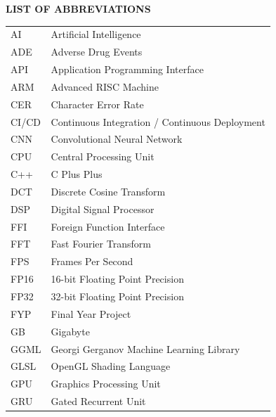 \documentclass[12pt,a4paper]{report}
\begin{document}
\begingroup
\renewcommand{\listtablename}{} %
\renewcommand{\clearpage}{}     %
\listoftables
\endgroup
\thispagestyle{logoheader}


\clearpage
\pagestyle{logoheader}
\thispagestyle{logoheader}
 
\begin{center}
    \vspace{1cm}
    {\large \textbf{LIST OF ABBREVIATIONS}}\\
    \vspace{1cm}
\end{center}

\begin{longtable}{p{6cm} p{9.5cm}}
AI      & Artificial Intelligence \\
ADE     & Adverse Drug Events \\
API     & Application Programming Interface \\
ARM     & Advanced RISC Machine \\
CER     & Character Error Rate \\
CI/CD   & Continuous Integration / Continuous Deployment \\
CNN     & Convolutional Neural Network \\
CPU     & Central Processing Unit \\
C++     & C Plus Plus \\
DCT     & Discrete Cosine Transform \\
DSP     & Digital Signal Processor \\
FFI     & Foreign Function Interface \\
FFT     & Fast Fourier Transform \\
FPS     & Frames Per Second \\
FP16    & 16-bit Floating Point Precision \\
FP32    & 32-bit Floating Point Precision \\
FYP     & Final Year Project \\
GB      & Gigabyte \\
GGML    & Georgi Gerganov Machine Learning Library \\
GLSL    & OpenGL Shading Language \\
GPU     & Graphics Processing Unit \\
GRU     & Gated Recurrent Unit \\

\end{longtable}
\end{document}

